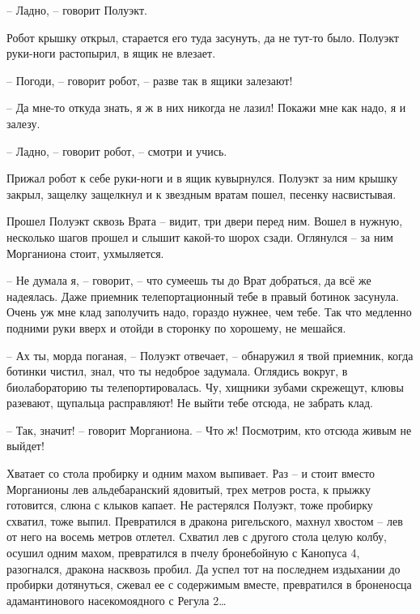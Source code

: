 \documentclass[ebook,oneside,final,openright]{memoir}
\begin{document}
– Ладно, – говорит Полуэкт.\par
Робот крышку открыл, старается его туда засунуть, да не тут-то было. Полуэкт руки-ноги растопырил, в ящик не влезает. \par
– Погоди, – говорит робот, – разве так в ящики залезают! \par
– Да мне-то откуда знать, я ж в них никогда не лазил! Покажи мне как надо, я и залезу. \par
– Ладно, – говорит робот, – смотри и учись. \par
Прижал робот к себе руки-ноги и в ящик кувырнулся. Полуэкт за ним крышку закрыл, защелку защелкнул и к звездным вратам пошел, песенку насвистывая.\par
\par
Прошел Полуэкт сквозь Врата – видит, три двери перед ним. Вошел в нужную, несколько шагов прошел и слышит какой-то шорох сзади. Оглянулся – за ним Морганиона стоит, ухмыляется. \par
\par
– Не думала я, – говорит, – что сумеешь ты до Врат добраться, да всё же надеялась. Даже приемник телепортационный тебе в правый ботинок засунула. Очень уж мне клад заполучить надо, гораздо нужнее, чем тебе. Так что медленно подними руки вверх и отойди в сторонку по хорошему, не мешайся.\par
– Ах ты, морда поганая, – Полуэкт отвечает, – обнаружил я твой приемник, когда ботинки чистил, знал, что ты недоброе задумала. Оглядись вокруг, в биолабораторию ты телепортировалась. Чу, хищники зубами скрежещут, клювы разевают, щупальца расправляют! Не выйти тебе отсюда, не забрать клад.\par
– Так, значит! – говорит Морганиона. – Что ж! Посмотрим, кто отсюда живым не выйдет!\par
\par
Хватает со стола пробирку и одним махом выпивает. Раз – и стоит вместо Морганионы лев альдебаранский ядовитый, трех метров роста, к прыжку готовится, слюна с клыков капает. Не растерялся Полуэкт, тоже пробирку схватил, тоже выпил. Превратился в дракона ригельского, махнул хвостом – лев от него на восемь метров отлетел. Схватил лев с другого стола целую колбу, осушил одним махом, превратился в пчелу бронебойную с Канопуса 4, разогнался, дракона насквозь пробил. Да успел тот на последнем издыхании до пробирки дотянуться, сжевал ее с содержимым вместе, превратился в броненосца адамантинового насекомоядного с Регула 2…\par
\par
\end{document}
